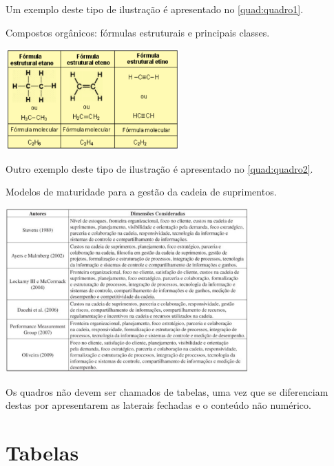 Um exemplo deste tipo de ilustração é apresentado no \autoref{quad:quadro1}.

\begin{tabframed}[htb]%
\captionsetup{width=0.5\textwidth}%
\caption{Compostos orgânicos: fórmulas estruturais e principais classes.}%
\label{quad:quadro1}%
\includegraphics[width=0.5\textwidth]{./CapituloExemplo/quadro1}%
\end{tabframed}

Outro exemplo deste tipo de ilustração é apresentado no \autoref{quad:quadro2}.

\begin{tabframed}[htb]%
\captionsetup{width=0.7\textwidth}%
\caption{Modelos de maturidade para a gestão da cadeia de suprimentos.}%
\label{quad:quadro2}%
\includegraphics[width=0.7\textwidth]{./CapituloExemplo/quadro2}%
\end{tabframed}

Os quadros não devem ser chamados de tabelas, uma vez que se diferenciam destas por apresentarem as laterais fechadas e o conteúdo não numérico.

\section{Tabelas}\label{sec:tabelas}

